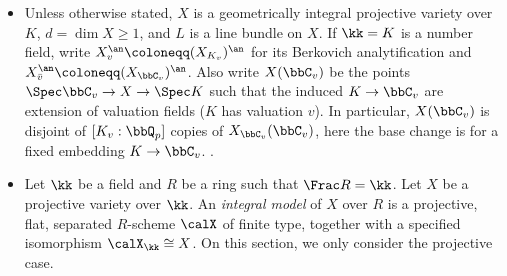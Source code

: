 \begin{notation}[label=\labelNFM{not:berkovich-space-and-a-geometry}, status=draft, tag=0000000]
\begin{itemize}
		      Then we have the product formula
		      \[ \sum_{v \in M_K}\latexdeletedmath{n_v}\latexaddedmath{\epsilon_v}\log|a|_v = 0 \quad (a \in K^*). \]
		      Write $\bbC_v$ for the completion of an algebraic closure of $K_v$; at an infinite place this means $\bbC$.
		\item Unless otherwise stated, $X$ is a geometrically integral projective variety over $K$, $d = \dim X \geq 1$, and $L$ is a line bundle on $X$.
		      If $\kk = K$ is a number field, write $X_{v}^\an \coloneqq (X_{K_v})^\an$ for its Berkovich analytification and $X_{\bar{v}}^\an \coloneqq (X_{\bbC_v})^\an$.
		      Also write $X(\bbC_v)$ be the points $\Spec \bbC_v \to X \to \Spec K$ such that the induced $K \to \bbC_v$ are extension of valuation fields ($K$ has valuation $v$).
		      In particular, $X(\bbC_v)$ is disjoint of $[K_v:\bbQ_p]$ copies of $X_{\bbC_v}(\bbC_v)$, here the base change is for a fixed embedding $K \to \bbC_v$.
		      \Yang{}.

		\item Let $\kk$ be a field and $R$ be a ring such that $\Frac R = \kk$.
		      Let $X$ be a projective variety over $\kk$.
		      An \emph{integral model} of $X$ over $R$ is a projective, flat, separated $R$-scheme $\calX$ of finite type, together with a specified isomorphism $\calX_\kk \cong X$.
		      On this section, we only consider the projective case.
		      \Yang{}
	\end{itemize}
	\Yang{}
\end{notation}

